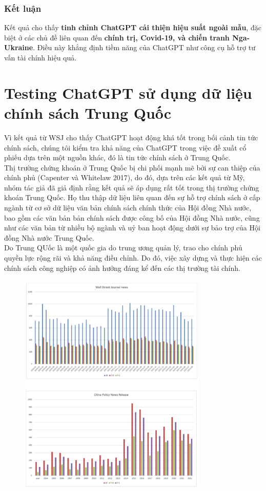 \documentclass[a4paper,12pt]{article}
\begin{document}
\subsubsection*{Kết luận}
Kết quả cho thấy \textbf{tinh chỉnh ChatGPT cải thiện hiệu suất ngoài mẫu}, đặc biệt ở các chủ đề liên quan đến \textbf{chính trị, Covid-19, và chiến tranh Nga-Ukraine}. Điều này khẳng định tiềm năng của ChatGPT như công cụ hỗ trợ tư vấn tài chính hiệu quả.

\section{Testing ChatGPT sử dụng dữ liệu chính sách Trung Quốc}
Vì kết quả từ WSJ cho thấy ChatGPT hoạt động khá tốt trong bối cảnh tin tức chính sách, chúng tôi kiểm tra khả năng của ChatGPT trong việc đề xuất cổ phiếu dựa trên một nguồn khác, đó là tin tức chính sách ở Trung Quốc.
\\ Thị trường chứng khoán ở Trung Quốc bị chi phối mạnh mẽ bởi sự can thiệp của chính phủ (Capenter và Whitelaw 2017), do đó, dựa trên các kết quả từ Mỹ, nhóm tác giả đã giả định rằng kết quả sẽ áp dụng rất tốt trong thị trường chứng khoán Trung Quốc. Họ thu thập dữ liệu liên quan đến sự hỗ trợ chính sách ở cấp ngành từ cơ sở dữ liệu văn bản chính sách chính thức của Hội đồng Nhà nước, bao gồm các văn bản bản chính sách được công bố của Hội đồng Nhà nước, cũng như các văn bản từ nhiều bộ ngành và uỷ ban hoạt động dưới sự bảo trợ của Hội đồng Nhà nước Trung Quốc. 
\\Do Trung QUốc là một quốc gia do
trung ương quản lý, trao cho chính phủ quyền lực rộng rãi và khả năng điều chỉnh. Do đó, việc xây dựng và thực hiện các chính sách công nghiệp có ảnh hưởng đáng kể đến các thị trường tài chính. 
\begin{figure}[H]
    \centering
    \includegraphics[width=0.8\textwidth]{fig/fig2.png}
    \label{fig:fig2}
\end{figure}
\end{document}
